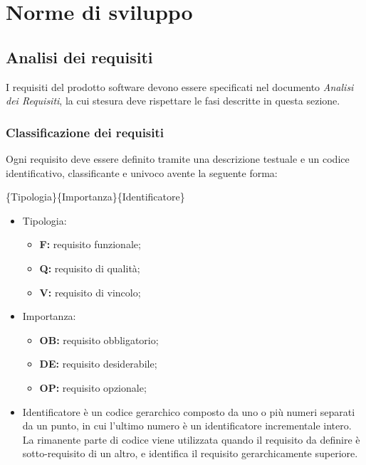 \section{Norme di sviluppo}
\subsection{Analisi dei requisiti}
I requisiti del prodotto software devono essere specificati nel documento \emph{Analisi dei Requisiti}, la cui stesura deve rispettare le fasi descritte in questa sezione.

\subsubsection{Classificazione dei requisiti}
Ogni requisito deve essere definito tramite  una descrizione testuale e un codice identificativo, classificante e univoco avente la seguente forma:

\begin{center}\{Tipologia\}\{Importanza\}\{Identificatore\}\end{center}


\begin{itemize}

\item Tipologia:
\begin{itemize}
\item \textbf{F:} requisito funzionale;
\item \textbf{Q:} requisito di qualità;
\item \textbf{V:} requisito di vincolo;
\end{itemize}

\item Importanza:
\begin{itemize}
\item \textbf{OB:} requisito obbligatorio;
\item \textbf{DE:} requisito desiderabile;
\item \textbf{OP:} requisito opzionale;
\end{itemize}

\item Identificatore è un codice gerarchico composto da uno o più numeri separati da un punto, in cui l'ultimo numero è un identificatore incrementale intero.\\
La rimanente parte di codice viene utilizzata quando il requisito da definire è sotto-requisito di un altro, e identifica il requisito gerarchicamente superiore.

\end{itemize}

